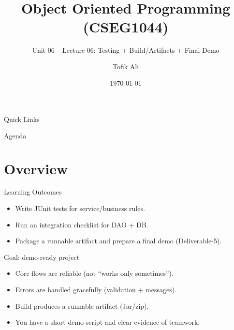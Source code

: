 \documentclass{beamer}
\title[OOPS with Java]{Object Oriented Programming (CSEG1044)}
\subtitle{Unit 06 -- Lecture 06: Testing + Build/Artifacts + Final Demo}
\author{Tofik Ali}
\institute{School of Computer Science, UPES Dehradun}
\date{\today}
\begin{document}
\begin{frame}[fragile]
  \titlepage
  \vspace{0.5em}
  \slidesources{\OOPSUnitVISources}
\end{frame}

\begin{frame}{Quick Links}
  \centering
  \hyperlink{sec:overview}{}\hspace{0.6em}
  \hyperlink{sec:concepts}{}\hspace{0.6em}
  \hyperlink{sec:demo}{}\hspace{0.6em}
  \hyperlink{sec:summary}{}
  \slidesources{\OOPSUnitVISources}
\end{frame}

\begin{frame}{Agenda}
  \tableofcontents
  \slidesources{\OOPSUnitVISources}
\end{frame}

\section{Overview}
\label{sec:overview}

\begin{frame}{Learning Outcomes}
  \begin{itemize}[<+->]
    \item Write JUnit tests for service/business rules.
    \item Run an integration checklist for DAO + DB.
    \item Package a runnable artifact and prepare a final demo (Deliverable-5).
  \end{itemize}
  \slidesources{\OOPSUnitVISources}
\end{frame}

\begin{frame}{Goal: demo-ready project}
  \begin{itemize}[<+->]
    \item Core flows are reliable (not ``works only sometimes'').
    \item Errors are handled gracefully (validation + messages).
    \item Build produces a runnable artifact (Jar/zip).
    \item You have a short demo script and clear evidence of teamwork.
  \end{itemize}
  \slidesources{\OOPSUnitVISources}
\end{frame}
\end{document}
